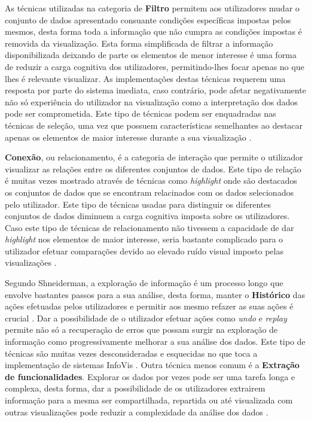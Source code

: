 As técnicas utilizadas na categoria de \textbf{Filtro} permitem aos utilizadores mudar o conjunto de dados apresentado consuante condições específicas impostas pelos mesmos, desta forma toda a informação que não cumpra as condições impostas é removida da visualização. Esta forma simplificada de filtrar a informação disponibilizada deixando de parte os elementos de menor interesse é uma forma de reduzir a carga cognitiva dos utilizadores, permitindo-lhes focar apenas no que lhes é relevante visualizar. As implementações destas técnicas requerem uma resposta por parte do sistema imediata, caso contrário, pode afetar negativamente não só experiência do utilizador na visualização como a interpretação dos dados pode ser comprometida. Este tipo de técnicas podem ser enquadradas nas técnicas de seleção, uma vez que possuem características semelhantes ao destacar apenas os elementos de maior interesse durante a sua visualização \cite{figueiras2015towards, yi2007toward}.

\textbf{Conexão}, ou relacionamento, é a categoria de interação que permite o utilizador visualizar as relações entre os diferentes conjuntos de dados. Este tipo de relação é muitas vezes mostrado através de técnicas como \textit{highlight} onde são destacados os conjuntos de dados que se encontram relacinados com os dados selecionados pelo utilizador. Este tipo de técnicas usadas para distinguir os diferentes conjuntos de dados diminuem a carga cognitiva imposta sobre os utilizadores. Caso este tipo de técnicas de relacionamento não tivessem a capacidade de dar \textit{highlight} nos elementos de maior interesse, seria bastante complicado para o utilizador efetuar comparações devido ao elevado ruído visual imposto pelas visualizações \cite{figueiras2015towards}.

Segundo Shneiderman, a exploração de informação é um processo longo que envolve bastantes passos para a sua análise, desta forma, manter o \textbf{Histórico} das ações efetuadas pelos utilizadores e permitir aos mesmo refazer as suas ações é crucial \cite{heer2012interactive}. Dar a possibilidade de o utilizador efetuar ações como \textit{undo} e \textit{replay} permite não só a recuperação de erros que possam surgir na exploração de informação como progressivamente melhorar a sua análise dos dados. Este tipo de técnicas são muitas vezes desconsideradas e esquecidas no que toca a implementação de sistemas \gls{InfoVis} \cite{figueiras2015towards}. Outra técnica menos comum é a \textbf{Extração de funcionalidades}. Explorar os dados por vezes pode ser uma tarefa longa e complexa, desta forma, dar a possibilidade de os utilizadores extrairem informação para a mesma ser compartilhada, repartida ou até visualizada com outras visualizações pode reduzir a complexidade da análise dos dados \cite{figueiras2015towards, heer2012interactive}.

